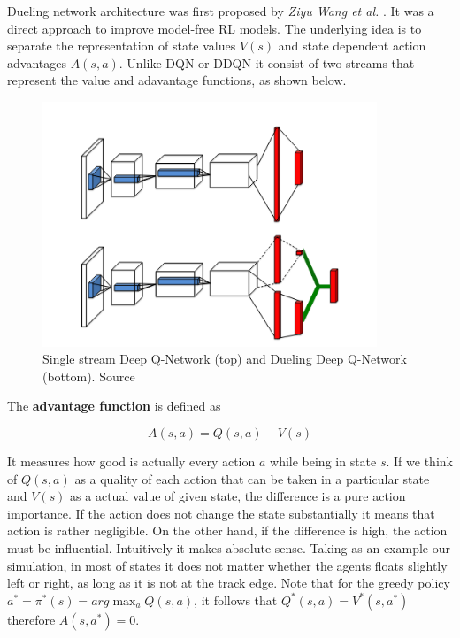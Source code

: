 Dueling network architecture was first proposed by \emph{Ziyu Wang  et al.} \cite{DBLP:journals/corr/WangFL15}. It was a direct approach to 
improve model-free RL models. The underlying idea is to separate the representation of state values $V(s)$ and state dependent action 
advantages $A(s, a)$. Unlike DQN or DDQN it consist of two streams that represent the value and adavantage functions, as shown below.

\begin{figure}[h]
    \centering
    \includegraphics[width=10cm]{img/dueling_vs_single_qn.png}
    \caption{Single stream Deep Q-Network (top) and Dueling Deep Q-Network (bottom). Source \cite{DBLP:journals/corr/WangFL15}}
    \label{fig:single-vs-dueling-q-network}
\end{figure}

The \textbf{advantage function} is defined as

\begin{equation}
    A(s, a) = Q(s, a) - V(s)
\label{eq:advantage}
\end{equation}

It measures how good is actually every action $a$ while being in state $s$. If we think of $Q(s, a)$ as a quality of each action that can be
taken in a particular state and $V(s)$ as a actual value of given state, the difference is a pure action importance. If the action does not 
change the state substantially it means that action is rather negligible. On the other hand, if the difference is high, the action must be
influential. Intuitively it makes absolute sense. Taking as an example our simulation, in most of states it does not matter whether the
agents floats slightly left or right, as long as it is not at the track edge. Note that for the greedy policy $a^* = \pi^*(s) =
arg\max_aQ(s, a)$, it follows that $Q^*(s, a) = V^*(s, a^*)$ therefore $A(s, a^*) = 0$.

